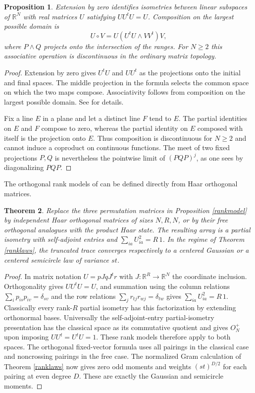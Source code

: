 \documentclass[11pt,a4paper]{article}
\newtheorem{thm}{Theorem}[section]
\newtheorem{prop}[thm]{Proposition}
\begin{document}
\begin{prop}\label{linearpartial}
Extension by zero identifies isometries between linear subspaces of $\mathbb R^N$ with real matrices $U$ satisfying $UU^tU=U$. Composition on the largest possible domain is
\[
 U\circ V=U(U^tU\wedge VV^t)V,
\]
where $P\wedge Q$ projects onto the intersection of the ranges. For $N\geq2$ this associative operation is discontinuous in the ordinary matrix topology.
\end{prop}
\begin{proof}
Extension by zero gives $U^tU$ and $UU^t$ as the projections onto the initial and final spaces. The middle projection in the formula selects the common space on which the two maps compose. Associativity follows from composition on the largest possible domain. See \cite{qp} for details.

Fix a line $E$ in a plane and let a distinct line $F$ tend to $E$. The partial identities on $E$ and $F$ compose to zero, whereas the partial identity on $E$ composed with itself is the projection onto $E$. Thus composition is discontinuous for $N\geq2$ and cannot induce a coproduct on continuous functions. The meet of two fixed projections $P,Q$ is nevertheless the pointwise limit of $(PQP)^j$, as one sees by diagonalizing $PQP$.
\end{proof}

The orthogonal rank models of \cite{qp} can be defined directly from Haar orthogonal matrices.

\begin{thm}
Replace the three permutation matrices in Proposition \ref{rankmodel} by independent Haar orthogonal matrices of sizes $N,R,N$, or by their free orthogonal analogues with the product Haar state. The resulting array is a partial isometry with self-adjoint entries and $\sum_{ia}U_{ia}^2=R\,1$. In the regime of Theorem \ref{ranklaws}, the truncated trace converges respectively to a centered Gaussian or a centered semicircle law of variance $st$.
\end{thm}
\begin{proof}
In matrix notation $U=pJqJ^tr$ with $J:\mathbb R^R\to\mathbb R^N$ the coordinate inclusion. Orthogonality gives $UU^tU=U$, and summation using the column relations $\sum_i p_{is}p_{iv}=\delta_{sv}$ and the row relations $\sum_j r_{tj}r_{wj}=\delta_{tw}$ gives $\sum_{ia}U_{ia}^2=R\,1$. Classically every rank-$R$ partial isometry has this factorization by extending orthonormal bases. Universally the self-adjoint-entry partial-isometry presentation has the classical space as its commutative quotient and gives $O_N^+$ upon imposing $UU^t=U^tU=1$. These rank models therefore apply to both spaces. The orthogonal fixed-vector formula uses all pairings in the classical case and noncrossing pairings in the free case. The normalized Gram calculation of Theorem \ref{ranklaws} now gives zero odd moments and weights $(st)^{D/2}$ for each pairing at even degree $D$. These are exactly the Gaussian and semicircle moments.
\end{proof}
\end{document}
